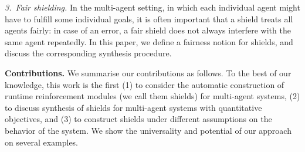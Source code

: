 \emph{3.\ Fair shielding.}
In the multi-agent setting, in which each individual agent might have to fulfill some individual goals, it is often important that a shield treats all agents fairly:
in case of an error, a fair shield does not always interfere with the same agent repeatedly.
In this paper, we define a fairness notion for shields, and discuss the corresponding synthesis procedure.

\textbf{Contributions.}  We summarise our contributions as follows. To the best of our knowledge, this work is the first (1) to consider the automatic construction of runtime reinforcement modules
(we call them shields) for multi-agent systems, (2) to discuss synthesis of shields for multi-agent systems with quantitative objectives,
and (3) to construct shields under different assumptions on the behavior of the system.
We show the universality and potential of our approach on several examples.

